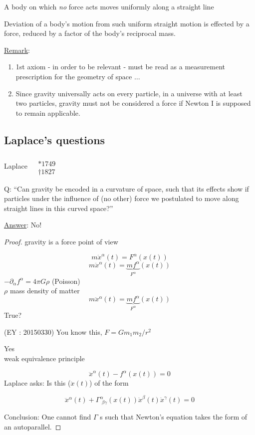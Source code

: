	\begin{axiom}[Newton I:]
		A body on which \emph{no} force acts moves uniformly along a straight line 
	\end{axiom}
	
	\begin{axiom}[Newton II:]
		Deviation of a body's motion from such uniform straight motion is effected by a force, reduced by a factor of the body's reciprocal mass.  
	\end{axiom}
	
	\underline{Remark}: \begin{enumerate}
		\item[(1)] 1st axiom - in order to be relevant - must be read as a measurement prescription for the geometry of space $\dots $
		\item[(2)] Since gravity universally acts on every particle, in a universe with at least two particles, gravity must not be considered a force if Newton I is supposed to remain applicable.  
	\end{enumerate}
	
	\subsection{Laplace's questions} Laplace $\begin{aligned}  & \quad \\ 
	& * 1749 \\
	& \dag 1827  \end{aligned}$
	
	Q: ``Can gravity be encoded in a curvature of space, such that its effects show if particles under the influence of (no other) force we postulated to move along straight lines in this curved space?''
	
	\underline{Answer}: No!
	
	\begin{proof}
		gravity is a force point of view
		
		
		\[
		m \ddot{x}^{\alpha}(t) = F^{\alpha}(x(t))
		\]
		\[
		m\ddot{x}^{\alpha}(t) = \underbrace{mf^{\alpha}}_{F^{\alpha}}(x(t))
		\]
		$-\partial_{\alpha} f^{\alpha} = 4\pi G\rho$ (Poisson) \\
		$\rho $ mass density of matter
		\[
		m \ddot{x}^{\alpha}(t)= \underbrace{mf^{\alpha}}_{F^{\alpha}}(x(t))
		\]
		True?
		
		(EY : 20150330) You know this, $F=Gm_1m_2/r^2$
		
		Yes \\ 
		weak equivalence principle
		
		\[
		\ddot{x}^{\alpha}(t) - f^{\alpha}(x(t)) = 0 
		\]
		Laplace asks: Is this ($\ddot{x}(t)$) of the form 
		
		\[
		\ddot{x}^{\alpha}(t) + \Gamma^{\alpha}_{\, \, \beta \gamma}(x(t)) \dot{x}^{\beta}(t) \dot{x}^{\gamma}(t) = 0 
		\]
		
		Conclusion: One cannot find $\Gamma$ s such that Newton's equation takes the form of an autoparallel.
		
	\end{proof}
	
